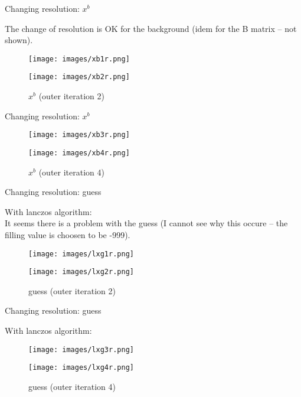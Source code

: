 \documentclass[francais]{beamer}
\begin{document}
\begin{frame}{Changing resolution: $x^b$}
\begin{center}
The change of resolution is OK for the background (idem for the B matrix -- not shown).
\begin{figure}
  \texttt{[image: images/xb1r.png]}
  \caption{$x^b$ (outer iteration 1)}
\endminipage\hfill
{}
  \texttt{[image: images/xb2r.png]}
  \caption{$x^b$ (outer iteration 2)}
\endminipage
\end{figure}
\end{center}
\end{frame}

\begin{frame}{Changing resolution: $x^b$}
\begin{center}
\begin{figure}
  \texttt{[image: images/xb3r.png]}
  \caption{$x^b$ (outer iteration 3)}
\endminipage \hfill
{}%
  \texttt{[image: images/xb4r.png]}
  \caption{$x^b$ (outer iteration 4)}
\endminipage
\end{figure}
\end{center}
\end{frame}


\begin{frame}{Changing resolution: guess}
\begin{center}
With lanczos algorithm:\\
It seems there is a problem with the guess (I cannot see why this occure -- the filling value is choosen to be -999).
\begin{figure}
  \texttt{[image: images/lxg1r.png]}
  \caption{guess (outer iteration 1)}
\endminipage\hfill
{}
  \texttt{[image: images/lxg2r.png]}
  \caption{guess (outer iteration 2)}
\endminipage
\end{figure}
\end{center}
\end{frame}

\begin{frame}{Changing resolution: guess}
\begin{center}
With lanczos algorithm:
\begin{figure}
  \texttt{[image: images/lxg3r.png]}
  \caption{guess (outer iteration 3)}
\endminipage \hfill
{}%
  \texttt{[image: images/lxg4r.png]}
  \caption{guess (outer iteration 4)}
\endminipage
\end{figure}
\end{center}
\end{frame}
\end{document}
